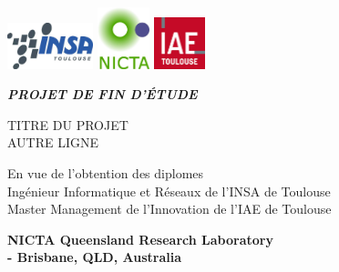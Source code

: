 \documentclass[10pt]{article}
\begin{document}
\def\labelitemi{--} %

\begin{titlepage}

\begin{center}

\includegraphics[width=2.5cm]{INSA-logo.jpg} \hspace{3cm}
\includegraphics[width=1.5cm]{NICTA-logo.jpg}\hspace{4cm}
\includegraphics[width=1.5cm]{IAE-logo.jpg} 

\vspace{3cm}
\textsc{\LARGE \textit{\textbf{\uppercase{Projet de fin d'étude}}}}
\vspace{1.5cm}

\begin{framed}
\LARGE \uppercase{titre du projet\\autre ligne}
\end{framed}

\vspace{1cm}
\large En vue de l'obtention des diplomes \\
Ingénieur Informatique et Réseaux de l'INSA de Toulouse\\
Master Management de l'Innovation de l'IAE de Toulouse

\end{center}
\vspace{1.5cm}
\begin{flushright}
\textbf{\large  NICTA Queensland Research Laboratory\\ \hspace{.5cm}- Brisbane, QLD, Australia}
\end{flushright}


\end{titlepage}
\end{document}
